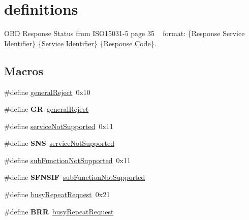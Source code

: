 \hypertarget{group__OBD__STATUS}{}\section{definitions}
\label{group__OBD__STATUS}


O\+BD Response Status from I\+S\+O15031-\/5 page 35 ~\newline
format\+: \{Response Service Identifier\} \{Service Identifier\} \{Response Code\}.  


\subsection*{Macros}
\begin{DoxyCompactItemize}
\item 
\#define \hyperlink{group__OBD__STATUS_ga79b0efdb947b5a43c04547709a3ed97d}{general\+Reject}~0x10
\item 
\mbox{\label{group__OBD__STATUS_ga656da95f9680f14093be09a52ab6752f}} 
\#define {\bfseries GR}~\hyperlink{group__OBD__STATUS_ga79b0efdb947b5a43c04547709a3ed97d}{general\+Reject}
\item 
\#define \hyperlink{group__OBD__STATUS_ga1bf8ad3c3e7062832dcd4ebe32728935}{service\+Not\+Supported}~0x11
\item 
\mbox{\label{group__OBD__STATUS_gaaed74ffd60140d8776b5dca5dda18ea2}} 
\#define {\bfseries S\+NS}~\hyperlink{group__OBD__STATUS_ga1bf8ad3c3e7062832dcd4ebe32728935}{service\+Not\+Supported}
\item 
\#define \hyperlink{group__OBD__STATUS_ga141faa9667e91c77460104aa475b4514}{sub\+Function\+Not\+Supported}~0x11
\item 
\mbox{\label{group__OBD__STATUS_gac35ea3f2e614be5b0f5eb3fabb78d3a6}} 
\#define {\bfseries S\+F\+N\+S\+IF}~\hyperlink{group__OBD__STATUS_ga141faa9667e91c77460104aa475b4514}{sub\+Function\+Not\+Supported}
\item 
\#define \hyperlink{group__OBD__STATUS_ga6d77101c239804b1292d038157a4ffe2}{busy\+Repeat\+Request}~0x21
\item 
\mbox{\label{group__OBD__STATUS_ga08c7f21c933165cdc17132746ad462e7}} 
\#define {\bfseries B\+RR}~\hyperlink{group__OBD__STATUS_ga6d77101c239804b1292d038157a4ffe2}{busy\+Repeat\+Request}

\end{DoxyCompactItemize}
